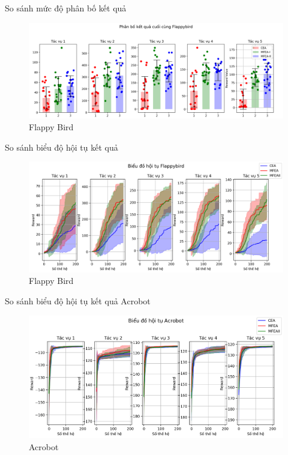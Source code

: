     \begin{frame}{So sánh mức độ phân bố kết quả}
        \begin{figure}[h!]
        \centering
        \includegraphics[width=\textwidth,height=\textheight,keepaspectratio]{images/flappybird.png}
        \caption{Flappy Bird}
        \label{fig:FLP}
    \end{figure}
    \end{frame}
    
    \begin{frame}{So sánh biểu độ hội tụ kết quả}
        \begin{figure}[h!]
        \centering
        \includegraphics[width=\textwidth,height=\textheight,keepaspectratio]{images/flappybird_conv.png}
        \caption{Flappy Bird}
        \label{fig:FLP}
    \end{figure}
    \end{frame}
    \begin{frame}{So sánh biểu độ hội tụ kết quả Acrobot}
        \begin{figure}[h!]
        \centering
        \includegraphics[width=\textwidth,height=\textheight,keepaspectratio]{images/acobot_conv.png}
        \caption{Acrobot}
        \label{fig:Acrobot}
    \end{figure}
    \end{frame}